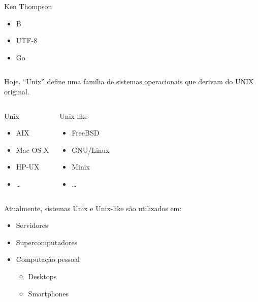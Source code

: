 \documentclass{beamer}
\begin{document}
\begin{frame}
\begin{columns}
\begin{block}{Ken Thompson}
      \begin{itemize}
      \item B
      \item UTF-8
      \item Go
      \end{itemize}

    \end{block}

  \end{columns}
\end{frame}

\begin{frame}

  Hoje, ``Unix'' define uma família de sistemas operacionais que derivam
  do UNIX original.

  \begin{columns}

    
    \begin{block}{Unix}
      \begin{itemize}
      \item AIX
      \item Mac OS X
      \item HP-UX
      \item \ldots
      \end{itemize}
    \end{block}


    \begin{block}{Unix-like}
      \begin{itemize}
      \item FreeBSD
      \item GNU/Linux
      \item Minix
      \item \ldots
      \end{itemize}
    \end{block}

  \end{columns}

\end{frame}

\begin{frame}
  
  Atualmente, sistemas Unix e Unix-like são utilizados em:

  \begin{itemize}
  \item Servidores
  \item Supercomputadores
  \item Computação pessoal
    \begin{itemize}
    \item Desktops
    \item Smartphones
    \end{itemize}
  \end{itemize}

\end{frame}
\end{document}
